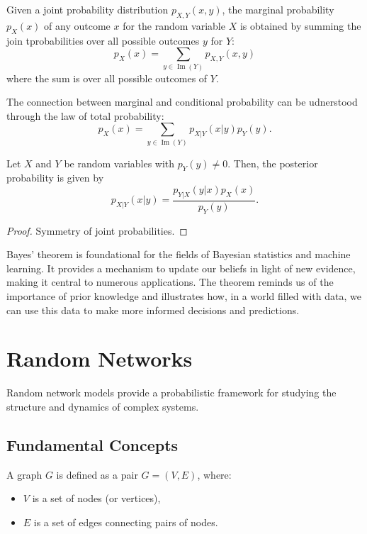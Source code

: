 \documentclass[10pt, headings=standardclasses, parskip=half, twoside]{scrartcl}
\renewcommand{\emph}[1]{\textcolor{mypurple}{#1}}
\newcommand{\im}{\operatorname{Im}}
\begin{document}
\begin{definition}\label{def:marginal}
Given a joint probability distribution \(p_{X,Y}(x,y)\), the marginal probability \(p_X(x)\) of any outcome \(x\) for the random variable \(X\) is obtained by summing the join tprobabilities over all possible outcomes \(y\) for \(Y\):
\[
p_X(x)=\sum_{y \in \im(Y)} p_{X,Y}(x,y)
\]
where the sum is over all possible outcomes of \(Y\).
\end{definition}
The connection between marginal and conditional probability can be udnerstood through the \emph{law of total probability}:
\[
p_X(x)=\sum_{y \in \im(Y)} p_{X|Y}(x|y)p_Y(y) \text{.}
\]


\begin{theorem}\label{thm:bayes}
Let \(X\) and \(Y\) be random variables with \(p_Y(y)\neq 0\). Then, the posterior probability is given by
\[
p_{X|Y}(x|y)=\frac{p_{Y|X}(y|x)p_X(x)}{p_Y(y)}.
\]
\end{theorem}

\begin{proof}
Symmetry of joint probabilities.
\end{proof}

Bayes' theorem is foundational for the fields of Bayesian statistics and machine learning. 
It provides a mechanism to update our beliefs in light of new evidence, making it central to numerous applications.
The theorem reminds us of the importance of prior knowledge and illustrates how, in a world filled with data, we can use this data to make more informed decisions and predictions.


















\clearpage
\section{Random Networks}\label{sec:networks}
Random network models provide a probabilistic framework for studying the structure and dynamics of complex systems.

\subsection{Fundamental Concepts}\label{subsec:graph}
\begin{definition}[Graph]\label{def:graph}
A graph \(G\) is defined as a pair \(G=(V,E)\), where:
\begin{itemize}[before={\parskip = 0em}, nosep]
  \item \(V\) is a set of nodes (or vertices),
  \item \(E\) is a set of edges connecting pairs of nodes. \qedhere
\end{itemize}
\end{definition}
\end{document}
